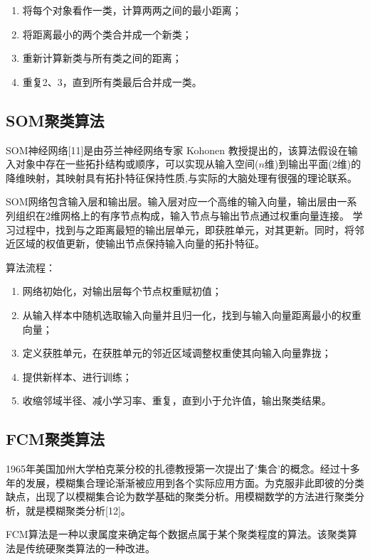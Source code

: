 \begin{enumerate}\itemsep0em 
		\item 将每个对象看作一类，计算两两之间的最小距离；
		\item 将距离最小的两个类合并成一个新类；
		\item 重新计算新类与所有类之间的距离；
		\item 重复2、3，直到所有类最后合并成一类。
\end{enumerate}

\subsection{SOM聚类算法}

SOM神经网络[11]是由芬兰神经网络专家 Kohonen 教授提出的，该算法假设在输入对象中存在一些拓扑结构或顺序，可以实现从输入空间($n$维)到输出平面($2$维)的降维映射，其映射具有拓扑特征保持性质,与实际的大脑处理有很强的理论联系。

SOM网络包含输入层和输出层。输入层对应一个高维的输入向量，输出层由一系列组织在$2$维网格上的有序节点构成，输入节点与输出节点通过权重向量连接。 学习过程中，找到与之距离最短的输出层单元，即获胜单元，对其更新。同时，将邻近区域的权值更新，使输出节点保持输入向量的拓扑特征。

算法流程：

\begin{enumerate}\itemsep0em 
		\item 网络初始化，对输出层每个节点权重赋初值；
		\item 从输入样本中随机选取输入向量并且归一化，找到与输入向量距离最小的权重向量；
		\item 定义获胜单元，在获胜单元的邻近区域调整权重使其向输入向量靠拢；
		\item 提供新样本、进行训练；
		\item 收缩邻域半径、减小学习率、重复，直到小于允许值，输出聚类结果。
\end{enumerate}

\subsection{FCM聚类算法}

1965年美国加州大学柏克莱分校的扎德教授第一次提出了‘集合’的概念。经过十多年的发展，模糊集合理论渐渐被应用到各个实际应用方面。为克服非此即彼的分类缺点，出现了以模糊集合论为数学基础的聚类分析。用模糊数学的方法进行聚类分析，就是模糊聚类分析[12]。  

FCM算法是一种以隶属度来确定每个数据点属于某个聚类程度的算法。该聚类算法是传统硬聚类算法的一种改进。  

